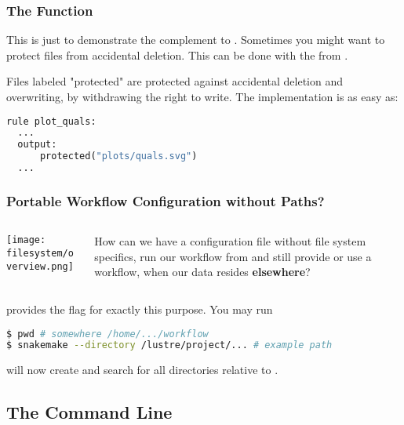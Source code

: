 \begin{frame}[fragile]
  \frametitle{The  Function}
  \begin{hint}
  	This is just to demonstrate the complement to . Sometimes you might want to protect files from accidental deletion. This can be done with the  from \Snakemake.
  \end{hint}
  \pause
  Files labeled "protected" are protected against accidental deletion and overwriting, by withdrawing the right to write. The implementation is as easy as:
  \begin{lstlisting}[language=Python,style=Python]
rule plot_quals:
  ...
  output: 
      protected("plots/quals.svg")
  ...
  \end{lstlisting}	
\end{frame} 

\begin{frame}[fragile]
  \frametitle{Portable Workflow Configuration without Paths?}
  \begin{columns}
  	\begin{column}{0.5\textwidth}
  	  \texttt{[image: filesystem/overview.png]}
  	\end{column}
    \begin{column}{0.5\textwidth}
    	\begin{question}
    		How can we have a configuration file without file system specifics, run our workflow from  and still provide or use a workflow, when our data resides \textbf{elsewhere}?
    	\end{question}
    \end{column}
  \end{columns}
  \pause
  \Snakemake provides the  flag for exactly this purpose. You may run
  \begin{lstlisting}[language=Bash, style=Shell]
$ pwd # somewhere /home/.../workflow
$ snakemake --directory /lustre/project/... # example path
  \end{lstlisting}
  \Snakemake will now create and search for all directories relative to .
\end{frame} 

\subsection{The Command Line}

